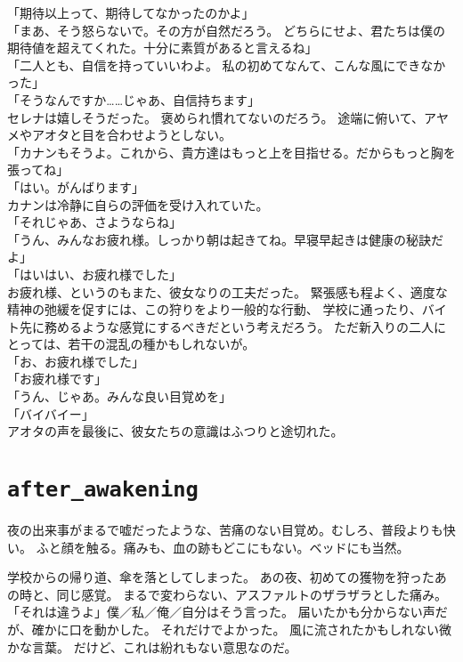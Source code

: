 \documentclass[../IHMain]{subfiles}
\begin{document}
「期待以上って、期待してなかったのかよ」\\
「まあ、そう怒らないで。その方が自然だろう。
どちらにせよ、君たちは僕の期待値を超えてくれた。十分に素質があると言えるね」\\
「二人とも、自信を持っていいわよ。
私の初めてなんて、こんな風にできなかった」\\
「そうなんですか……じゃあ、自信持ちます」\\
セレナは嬉しそうだった。
褒められ慣れてないのだろう。
途端に俯いて、アヤメやアオタと目を合わせようとしない。\\
「カナンもそうよ。これから、貴方達はもっと上を目指せる。だからもっと胸を張ってね」\\
「はい。がんばります」\\

カナンは冷静に自らの評価を受け入れていた。\\
「それじゃあ、さようならね」\\
「うん、みんなお疲れ様。しっかり朝は起きてね。早寝早起きは健康の秘訣だよ」\\
「はいはい、お疲れ様でした」\\
お疲れ様、というのもまた、彼女なりの工夫だった。
緊張感も程よく、適度な精神の弛緩を促すには、この狩りをより一般的な行動、
学校に通ったり、バイト先に務めるような感覚にするべきだという考えだろう。
ただ新入りの二人にとっては、若干の混乱の種かもしれないが。\\
「お、お疲れ様でした」\\
「お疲れ様です」\\
「うん、じゃあ。みんな良い目覚めを」\\
「バイバイー」\\
アオタの声を最後に、彼女たちの意識はふつりと途切れた。

\clearpage
\thispagestyle{empty}
\section*{\tt after\_awakening}
夜の出来事がまるで嘘だったような、苦痛のない目覚め。むしろ、普段よりも快い。
ふと顔を触る。痛みも、血の跡もどこにもない。ベッドにも当然。

学校からの帰り道、傘を落としてしまった。
あの夜、初めての獲物を狩ったあの時と、同じ感覚。
まるで変わらない、アスファルトのザラザラとした痛み。\\

「それは違うよ」僕／私／俺／自分はそう言った。
届いたかも分からない声だが、確かに口を動かした。
それだけでよかった。
風に流されたかもしれない微かな言葉。
だけど、これは紛れもない意思なのだ。\\
\end{document}
